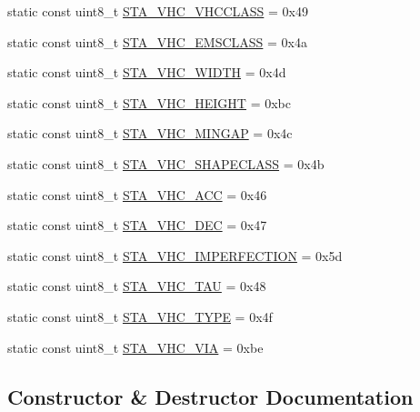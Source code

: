\begin{DoxyCompactItemize}
static const uint8\+\_\+t \hyperlink{classtraci__api_1_1_vehicle_manager_a4b6b8a21fb21e6d37165c96faad2bf42}{S\+T\+A\+\_\+\+V\+H\+C\+\_\+\+V\+H\+C\+C\+L\+A\+SS} = 0x49
\item 
static const uint8\+\_\+t \hyperlink{classtraci__api_1_1_vehicle_manager_a26d3c7c5eaa33aeadacffe05d61a062c}{S\+T\+A\+\_\+\+V\+H\+C\+\_\+\+E\+M\+S\+C\+L\+A\+SS} = 0x4a
\item 
static const uint8\+\_\+t \hyperlink{classtraci__api_1_1_vehicle_manager_a60dbed8e67261ea813a06af7eff66fe2}{S\+T\+A\+\_\+\+V\+H\+C\+\_\+\+W\+I\+D\+TH} = 0x4d
\item 
static const uint8\+\_\+t \hyperlink{classtraci__api_1_1_vehicle_manager_a2f0dc714583c0f7577f8464935e7bf7a}{S\+T\+A\+\_\+\+V\+H\+C\+\_\+\+H\+E\+I\+G\+HT} = 0xbc
\item 
static const uint8\+\_\+t \hyperlink{classtraci__api_1_1_vehicle_manager_ae26c5e4015d940da17ebcb55990db55a}{S\+T\+A\+\_\+\+V\+H\+C\+\_\+\+M\+I\+N\+G\+AP} = 0x4c
\item 
static const uint8\+\_\+t \hyperlink{classtraci__api_1_1_vehicle_manager_aa5ba3595345996574b51e72d5f6bd034}{S\+T\+A\+\_\+\+V\+H\+C\+\_\+\+S\+H\+A\+P\+E\+C\+L\+A\+SS} = 0x4b
\item 
static const uint8\+\_\+t \hyperlink{classtraci__api_1_1_vehicle_manager_ab9130691efa04efde88822a7876c330d}{S\+T\+A\+\_\+\+V\+H\+C\+\_\+\+A\+CC} = 0x46
\item 
static const uint8\+\_\+t \hyperlink{classtraci__api_1_1_vehicle_manager_ad2c2a68fe86ebb06c85e989fed90c97f}{S\+T\+A\+\_\+\+V\+H\+C\+\_\+\+D\+EC} = 0x47
\item 
static const uint8\+\_\+t \hyperlink{classtraci__api_1_1_vehicle_manager_aa36ca1986b29b2df2ec054785d18afd5}{S\+T\+A\+\_\+\+V\+H\+C\+\_\+\+I\+M\+P\+E\+R\+F\+E\+C\+T\+I\+ON} = 0x5d
\item 
static const uint8\+\_\+t \hyperlink{classtraci__api_1_1_vehicle_manager_a93d27a387090ce7b8e6b7afc1a9d80b1}{S\+T\+A\+\_\+\+V\+H\+C\+\_\+\+T\+AU} = 0x48
\item 
static const uint8\+\_\+t \hyperlink{classtraci__api_1_1_vehicle_manager_a7b034d47f44d94bea5497357093fc1ce}{S\+T\+A\+\_\+\+V\+H\+C\+\_\+\+T\+Y\+PE} = 0x4f
\item 
static const uint8\+\_\+t \hyperlink{classtraci__api_1_1_vehicle_manager_ae66ccdcffdd1e46ed0edac4e7a33598f}{S\+T\+A\+\_\+\+V\+H\+C\+\_\+\+V\+IA} = 0xbe
\end{DoxyCompactItemize}


\subsection{Constructor \& Destructor Documentation}
\mbox{\label{classtraci__api_1_1_vehicle_manager_a7e9e05b65776f0709f0b84a51c44377f}} 
